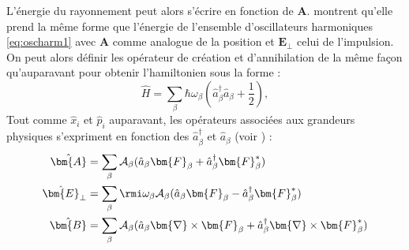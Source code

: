 L'énergie du rayonnement peut alors s'écrire en fonction de $\bm{A}$.  montrent qu'elle prend la même forme que l'énergie de l'ensemble d'oscillateurs harmoniques \ref{eq:oscharm1} avec $\bm{A}$ comme analogue de la position et $\bm{E}_{\bot}$ celui de l'impulsion. On peut alors définir les opérateur de création et d'annihilation de la même façon qu'auparavant pour obtenir l'hamiltonien sous la forme :
\begin{equation*}
\hat{H}=\sum_{\beta} \hbar\omega_{\beta}\left(\hat{a}^{\dag}_{\beta}\hat{a}_{\beta}+\frac{1}{2}\right),
\end{equation*}
Tout comme $\hat{x}_i$ et $\hat{p}_i$ auparavant, les opérateurs associées aux grandeurs physiques s'expriment en fonction des $\hat{a}^{\dag}_{\beta}$ et $\hat{a}_{\beta}$ (voir ) :
\begin{align}
\hat{\bm{A}} &= \sum_{\beta}{\mathcal{A}_{\beta} (\hat{a}_{\beta}\bm{F}_{\beta}+\hat{a}^{\dag}_{\beta}\bm{F}^*_{\beta}}) \nonumber\\
\hat{\bm{E}}_{\bot} &= \sum_{\beta}{\rmi \omega_{\beta}\mathcal{A}_{\beta} (\hat{a}_{\beta}\bm{F}_{\beta}-\hat{a}^{\dag}_{\beta}\bm{F}^*_{\beta}}) \nonumber\\
\hat{\bm{B}} &=\sum_{\beta}{\mathcal{A}_{\beta} (\hat{a}_{\beta}\bm{\nabla}\times\bm{F}_{\beta}+\hat{a}^{\dag}_{\beta}\bm{\nabla}\times\bm{F}^*_{\beta}})
\label{eq:Qfields}
\end{align}
